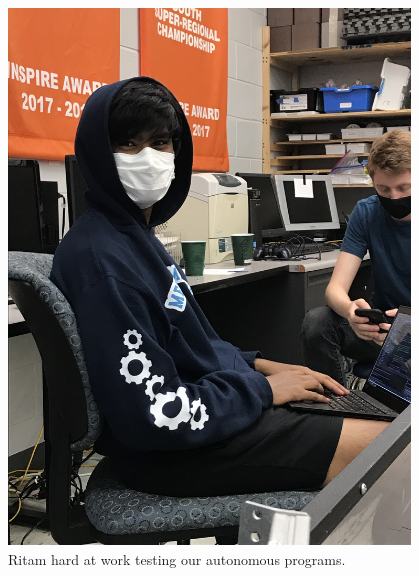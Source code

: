 \begin{figure}[htp]
\centering
\includegraphics[width=0.95\textwidth, angle=0]{Meetings/April/04-05-22/04-05-22 1.JPG}
\caption{Ritam hard at work testing our autonomous programs.}
\label{fig:040522_1}
\end{figure}





